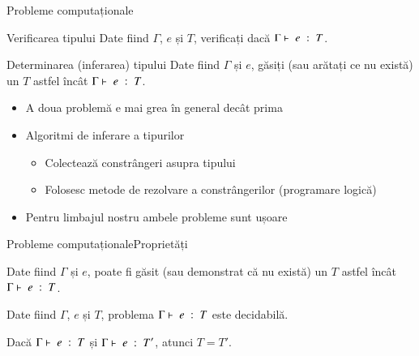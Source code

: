 \documentclass[xcolor=pdftex,romanian,colorlinks]{beamer}
\begin{document}
\begin{frame}{Probleme computaționale}
\begin{block}{Verificarea tipului}
Date fiind $\Gamma$, $e$ și $T$, verificați dacă ${\displaystyle \Gamma\vdash \; e \; : \; T}$.
\end{block}

\begin{block}{Determinarea (inferarea) tipului}
Date fiind $\Gamma$ și $e$, găsiți (sau arătați ce nu există) un $T$ astfel încât ${\displaystyle \Gamma\vdash \; e \; : \; T}$.
\end{block}

\begin{itemize}
\item A doua problemă e mai grea în general decât prima
\item Algoritmi de inferare a tipurilor
\begin{itemize}
\item Colectează constrângeri asupra tipului
\item Folosesc metode de rezolvare a constrângerilor (programare logică)
\end{itemize}
\item Pentru limbajul nostru ambele probleme sunt ușoare
\end{itemize}
\end{frame}

\begin{frame}{Probleme computaționale}{Proprietăți}
\begin{theorem}
Date fiind $\Gamma$ și $e$, poate fi găsit (sau demonstrat că nu există) un $T$ astfel încât 
${\displaystyle \Gamma\vdash \; e \; : \; T}$.
\end{theorem}
\vfill

\begin{theorem}
Date fiind $\Gamma$, $e$ și $T$, problema ${\displaystyle \Gamma\vdash \; e \; : \; T}$ este decidabilă.
\end{theorem}

\vfill
\begin{theorem}
Dacă ${\displaystyle \Gamma\vdash \; e \; : \; T}$ și ${\displaystyle \Gamma\vdash \; e \; : \; T'}$, atunci $T=T'$.
\end{theorem}
\end{frame}
\end{document}
